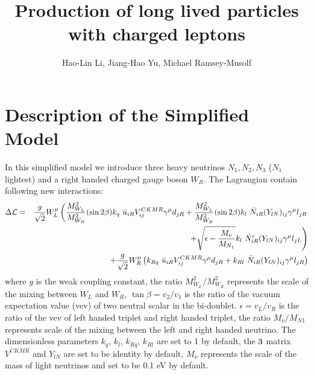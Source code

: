\documentclass[12pt]{article}
\begin{document}
 
 
\title{Production of long lived particles with charged leptons}
\author{Hao-Lin Li, Jiang-Hao Yu, Michael Ramsey-Musolf}
\maketitle
\section{Description of the Simplified Model}
In this simplified model we introduce three heavy neutrinos $N_1, N_2, N_3$ ($N_1$ lightest) and a right handed charged gauge boson $W_R$. The Lagrangian contain following new interactions:
\begin{eqnarray}
{\Delta\cal L}&=&\frac{g}{\sqrt{2}}W_L^\mu \left(\frac{M^2_{W_L}}{M^2_{W_R}}(\sin{2\beta})k_q\ \bar{u}_{iR} V^{CKMR}_{ij}\gamma^\mu d_{jR}+\frac{M^2_{W_L}}{M^2_{W_R}}(\sin{2\beta})k_l\ \bar{N}_{iR} (Y_{lN})_{ij}\gamma^\mu l_{jR} \right. \nonumber \\
&&\left. +\sqrt{\epsilon-\frac{M_{\nu}}{M_{N_1}}}k_l\ \bar{N}^c_{iR} (Y_{lN})_{ij}\gamma^\mu l_{jL}\right)\nonumber \\
&&+\frac{g}{\sqrt{2}}W_R^\mu \left(k_{Rq}\ \bar{u}_{iR} V^{CKMR}_{ij}\gamma^\mu d_{jR}+k_{Rl}\ \bar{N}_{iR} (Y_{lN})_{ij}\gamma^\mu l_{jR}\right)
\end{eqnarray}
where $g$ is the weak coupling constant, the ratio $M^2_{W_L}/M^2_{W_R}$ represents the scale of the mixing between $W_L$ and $W_R$, $\tan\beta=v_2/v_1$ is the ratio of the vacuum expectation value (vev) of two neutral scalar in the bi-doublet. $\epsilon=v_L/v_R$ is the ratio of the vev of left handed triplet and right handed triplet, the ratio $M_\nu/M_{N1}$ represents scale of the mixing between the left and right handed neutrino. The dimensionless parameters $k_q$, $k_l$, $k_{Rq}$, $k_{Rl}$ are set to 1 by default, the $3\time 3$ matrix $V^{CKMR}$ and $Y_{lN}$ are set to be identity by default, $M_{\nu}$ represents the scale of the mass of light neutrinos and set to be 0.1 eV by default.
\end{document}
